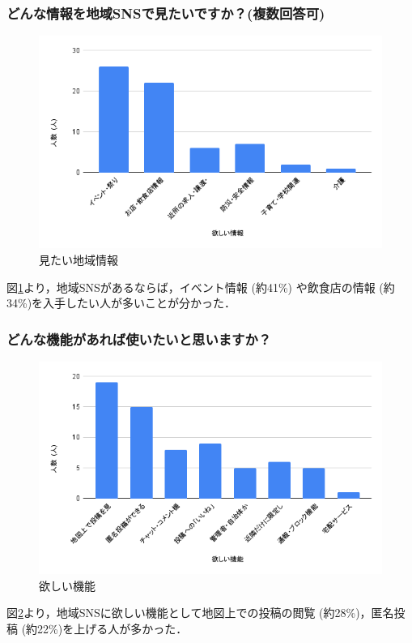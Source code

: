\subsubsection{どんな情報を地域SNSで見たいですか？(複数回答可)}
\begin{figure}[H]
    \centering
    \includegraphics[width=0.5\linewidth]{sections/fig125/Q4.png}
    \caption{見たい地域情報}
    \label{fig:Q4}
\end{figure}
図\ref{fig:Q4}より，地域SNSがあるならば，イベント情報 (約41\%) や飲食店の情報 (約34\%)を入手したい人が多いことが分かった．

\subsubsection{どんな機能があれば使いたいと思いますか？}
\begin{figure}[H]
    \centering
    \includegraphics[width=0.5\linewidth]{sections/fig125/Q7.png}
    \caption{欲しい機能}
    \label{fig:Q7}
\end{figure}
図\ref{fig:Q7}より，地域SNSに欲しい機能として地図上での投稿の閲覧 (約28\%)，匿名投稿 (約22\%)を上げる人が多かった．

